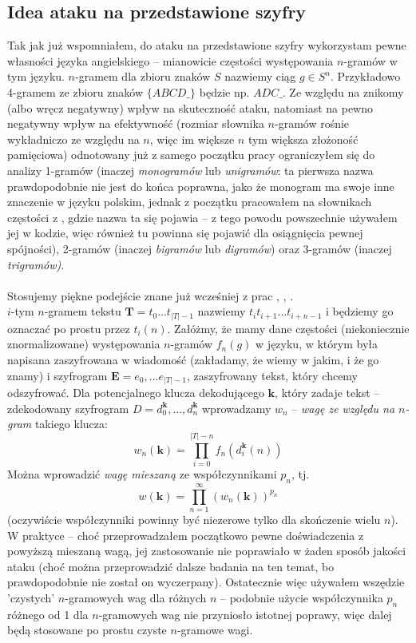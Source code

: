 \documentclass[a4paper]{article}
\theoremstyle{defn}
\theoremstyle{theorem}
\theoremstyle{lemma}
\theoremstyle{cor}
\theoremstyle{fact}
\begin{document}
\subsection{Idea ataku na przedstawione szyfry}
\label{sect4.3}
Tak jak już wspomniałem, do ataku na przedstawione szyfry wykorzystam pewne własności języka angielskiego – mianowicie częstości występowania $n$-gramów w tym języku. $n$-gramem dla zbioru znaków $S$ nazwiemy ciąg $g \in S^n$. Przykładowo 4-gramem ze zbioru znaków $\{ABCD\_\}$ będzie np. $ADC\_$. Ze względu na znikomy (albo wręcz negatywny) wpływ na skuteczność ataku, natomiast na pewno negatywny wpływ na efektywność (rozmiar słownika $n$-gramów rośnie wykładniczo ze względu na $n$, więc im większe $n$ tym większa złożoność pamięciowa) odnotowany już z samego początku pracy ograniczyłem się do analizy 1-gramów (inaczej \textit{monogramów} lub \textit{unigramów}: ta pierwsza nazwa prawdopodobnie nie jest do końca poprawna, jako że monogram ma swoje inne znaczenie w języku polskim, jednak z początku pracowałem na słownikach częstości z \cite{czestosc}, gdzie nazwa ta się pojawia – z tego powodu powszechnie używałem jej w kodzie, więc również tu powinna się pojawić dla osiągnięcia pewnej spójności), 2-gramów (inaczej \textit{bigramów} lub \textit{digramów}) oraz 3-gramów (inaczej \textit{trigramów)}.\\\\
Stosujemy piękne podejście znane już wcześniej z prac \cite{Diaconis}, \cite{Connor}, \cite{Chen&Rosenthal}. \\
$i$-tym $n$-gramem tekstu $\boldsymbol{T} = t_0...t_{|T|-1}$ nazwiemy $t_it_{i+1}...t_{i+n-1}$ i będziemy go oznaczać po prostu przez $t_i(n)$. Załóżmy, że mamy dane częstości (niekoniecznie znormalizowane) występowania $n$-gramów $f_n(g)$ w języku, w którym była napisana zaszyfrowana w wiadomość (zakładamy, że wiemy w jakim, i że go znamy) i szyfrogram $\boldsymbol{E}=e_0,...e_{|T|-1}$, zaszyfrowany tekst, który chcemy odszyfrować. Dla potencjalnego klucza dekodującego $\boldsymbol{k}$, który zadaje tekst – zdekodowany szyfrogram $D=d_0^{\boldsymbol{k}}, ..., d_n^{\boldsymbol{k}}$ wprowadzamy $w_n$ – \textit{wagę ze względu na $n$-gram} takiego klucza:
$$w_n(\boldsymbol{k}) = \prod\limits_{i=0}^{|T|- n} f_n(d_i^{\boldsymbol{k}}(n))$$
Można wprowadzić \textit{wagę mieszaną} ze współczynnikami $p_n$, tj.
$$w(\boldsymbol{k}) = \prod\limits_{n=1}^{\infty} (w_n(\boldsymbol{k}))^{p_n}$$
(oczywiście współczynniki powinny być niezerowe tylko dla skończenie wielu $n$). W praktyce – choć przeprowadzałem początkowo pewne doświadczenia z powyższą mieszaną wagą, jej zastosowanie nie poprawiało w żaden sposób jakości ataku (choć można przeprowadzić dalsze badania na ten temat, bo prawdopodobnie nie został on wyczerpany). Ostatecznie więc używałem wszędzie 'czystych' $n$-gramowych wag dla różnych $n$ – podobnie użycie współczynnika $p_n$ różnego od 1 dla $n$-gramowych wag nie przyniosło istotnej poprawy, więc dalej będą stosowane po prostu czyste $n$-gramowe wagi.\\
\end{document}
